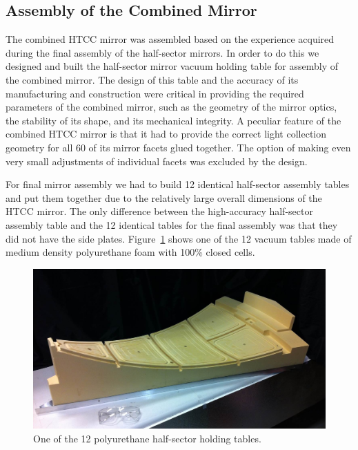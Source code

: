 \subsection{Assembly of the Combined Mirror}

The combined HTCC mirror was assembled based on the experience acquired during the final assembly of the
half-sector mirrors. In order to do this we designed and built the half-sector mirror vacuum holding table for
assembly of the combined mirror. The design of this table and the accuracy of its manufacturing and construction
were critical in providing the required parameters of the combined mirror, such as the geometry of the mirror
optics, the stability of its shape, and its mechanical integrity. A peculiar feature of the combined HTCC mirror is
that it had to provide the correct light collection geometry for all 60 of its mirror facets glued together. The
option of making even very small adjustments of individual facets was excluded by the design.
 
For final mirror assembly we had to build 12 identical half-sector assembly tables and put them together due to
the relatively large overall dimensions of the HTCC mirror. The only difference between the high-accuracy
half-sector assembly table and the 12 identical tables for the final assembly was that they did not have the side
plates. Figure~\ref{fig:One_Foam_Vacuum_Table} shows one of the 12 vacuum tables made of medium density
polyurethane foam with 100\% closed cells.
 
\begin{figure}[ht]
    \centering
    \includegraphics[width=1.0\linewidth]{images/One_Foam_Vacuum_Table.jpg}
    \caption{One of the 12 polyurethane half-sector holding tables.}
    \label{fig:One_Foam_Vacuum_Table}
\end{figure}
 
